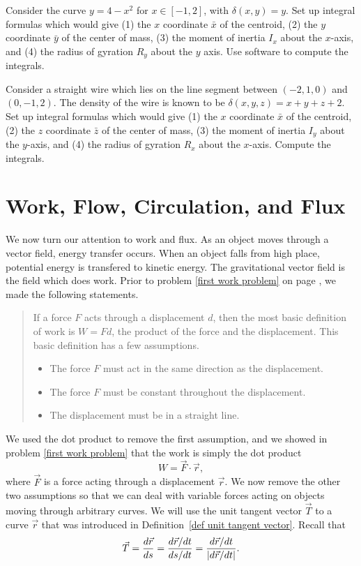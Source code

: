 \begin{problem}
Consider the curve $y=4-x^2$ for $x\in[-1,2]$, with $\delta (x,y) = y$.  Set up integral formulas which would give (1) the $x$ coordinate $\bar x$ of the centroid, (2) the $y$ coordinate $\bar y$ of the center of mass, (3) the moment of inertia $I_x$ about the $x$-axis, and (4) the radius of gyration $R_y$ about the $y$ axis. Use software to compute the integrals.
\end{problem}

\begin{problem}
 Consider a straight wire which lies on the line segment between $(-2,1,0)$ and $(0,-1,2)$. The density of the wire is known to be $\delta(x,y,z) = x+y+z+2$. Set up integral formulas which would give (1) the $x$ coordinate $\bar x$ of the centroid, (2) the $z$ coordinate $\bar z$ of the center of mass, (3) the moment of inertia $I_y$ about the $y$-axis, and (4) the radius of gyration $R_x$ about the $x$-axis. Compute the integrals.
\end{problem}


\section{Work, Flow, Circulation, and Flux}

We now turn our attention to work and flux.  As an object moves through a vector field, energy transfer occurs.  When an object falls from high place, potential energy is transfered to kinetic energy. The gravitational vector field is the field which does work. Prior to problem \ref{first work problem} on page \pageref{first work problem}, we made the following statements. 
\begin{quote}If a force $F$ acts through a displacement $d$, then the most basic definition of work is $W=Fd$, the product of the force and the displacement.  This basic definition has a few assumptions.
\begin{itemize}
\item The force $F$ must act in the same direction as the displacement.
\item The force $F$ must be constant throughout the  displacement.
\item The displacement must be in a straight line.
\end{itemize}
\end{quote}
We used the dot product to remove the first assumption, and we showed in problem \ref{first work problem} that the work is simply the dot product $$W=\vec F\cdot \vec r,$$
where $\vec F$ is a force acting through a displacement $\vec r$. We now remove the other two assumptions so that we can deal with variable forces acting on objects moving through arbitrary curves.  We will use the unit tangent vector $\vec T$ to a curve $\vec r$ that was introduced in Definition~\ref{def unit tangent vector}.  Recall that 
$$\vec T = \displaystyle\frac{d\vec r}{ds}=\displaystyle\frac{d\vec r/dt}{ds/dt} = \frac{d\vec r/dt}{|d \vec r/dt|}.$$

